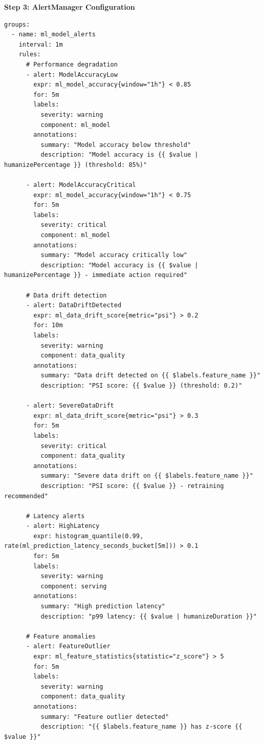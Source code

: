 \textbf{Step 3: AlertManager Configuration}

\begin{lstlisting}[style=yaml, caption=AlertManager Rules (prometheus-rules.yaml)]
groups:
  - name: ml_model_alerts
    interval: 1m
    rules:
      # Performance degradation
      - alert: ModelAccuracyLow
        expr: ml_model_accuracy{window="1h"} < 0.85
        for: 5m
        labels:
          severity: warning
          component: ml_model
        annotations:
          summary: "Model accuracy below threshold"
          description: "Model accuracy is {{ $value | humanizePercentage }} (threshold: 85%)"

      - alert: ModelAccuracyCritical
        expr: ml_model_accuracy{window="1h"} < 0.75
        for: 5m
        labels:
          severity: critical
          component: ml_model
        annotations:
          summary: "Model accuracy critically low"
          description: "Model accuracy is {{ $value | humanizePercentage }} - immediate action required"

      # Data drift detection
      - alert: DataDriftDetected
        expr: ml_data_drift_score{metric="psi"} > 0.2
        for: 10m
        labels:
          severity: warning
          component: data_quality
        annotations:
          summary: "Data drift detected on {{ $labels.feature_name }}"
          description: "PSI score: {{ $value }} (threshold: 0.2)"

      - alert: SevereDataDrift
        expr: ml_data_drift_score{metric="psi"} > 0.3
        for: 5m
        labels:
          severity: critical
          component: data_quality
        annotations:
          summary: "Severe data drift on {{ $labels.feature_name }}"
          description: "PSI score: {{ $value }} - retraining recommended"

      # Latency alerts
      - alert: HighLatency
        expr: histogram_quantile(0.99, rate(ml_prediction_latency_seconds_bucket[5m])) > 0.1
        for: 5m
        labels:
          severity: warning
          component: serving
        annotations:
          summary: "High prediction latency"
          description: "p99 latency: {{ $value | humanizeDuration }}"

      # Feature anomalies
      - alert: FeatureOutlier
        expr: ml_feature_statistics{statistic="z_score"} > 5
        for: 5m
        labels:
          severity: warning
          component: data_quality
        annotations:
          summary: "Feature outlier detected"
          description: "{{ $labels.feature_name }} has z-score {{ $value }}"


\end{lstlisting}
